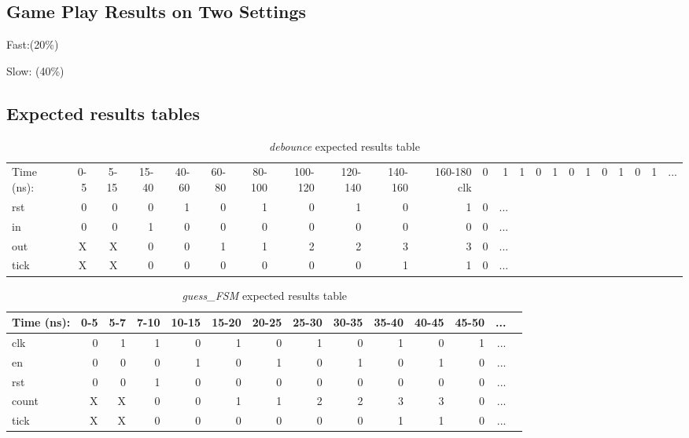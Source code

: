 \documentclass[11pt]{article}
\begin{document}
\subsection*{Game Play Results on Two Settings}
Fast:(20\%)

Slow: (40\%)

\subsection*{Expected results tables}

\begin{table}[ht]\centering
	\caption{\textit{debounce} expected results table}
	\label{ALU:tbl:alu_ERT}\medskip
	\begin{tabular}{l|rrrrrrrrrrrrrrr}
		Time (ns): & 0-5 & 5-15 & 15-40 & 40-60 & 60-80 & 80-100 & 100-120 & 120-140 & 140-160 & 160-180 
		\midrule
		clk & 0  & 1 & 1 & 0 & 1 & 0 & 1 & 0 & 1 & 0 & 1 & ... \\
		rst & 0 & 0 & 0 & 1 & 0 & 1 & 0 & 1 & 0 & 1 & 0 & ...\\
		in & 0 & 0 & 1& 0 & 0 & 0 & 0 & 0 & 0 & 0 & 0 & ... \\
		\midrule
		out & X & X & 0 & 0  & 1 & 1 & 2 & 2 & 3 & 3 & 0 & ... \\
		tick & X & X & 0 & 0 & 0 & 0 & 0 & 0 & 1 & 1 & 0& ... \\
		\bottomrule
		
	\end{tabular}
\end{table}

\begin{table}[ht]\centering
	\caption{\textit{guess\_FSM} expected results table}
	\label{ALU:tbl:alu_ERT}\medskip
	\begin{tabular}{l|rrrrrrrrrrrrr}
		Time (ns): & 0-5 & 5-7 & 7-10 & 10-15 & 15-20 & 20-25 & 25-30 & 30-35 & 35-40 & 40-45 & 45-50 &...\\
		\midrule
		clk & 0  & 1 & 1 & 0 & 1 & 0 & 1 & 0 & 1 & 0 & 1 & ... \\
		en & 0 & 0 & 0 & 1 & 0 & 1 & 0 & 1 & 0 & 1 & 0 & ...\\
		rst & 0 & 0 & 1& 0 & 0 & 0 & 0 & 0 & 0 & 0 & 0 & ... \\
		\midrule
		count & X & X & 0 & 0  & 1 & 1 & 2 & 2 & 3 & 3 & 0 & ... \\
		tick & X & X & 0 & 0 & 0 & 0 & 0 & 0 & 1 & 1 & 0& ... \\
		\bottomrule
	\end{tabular}
\end{table}
\end{document}
